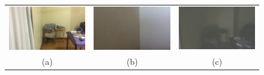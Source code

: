 \documentclass[letterpaper, 10 pt, conference]{ieeeconf}  %
\begin{document}
\begin{figure}[htbp]
\begin{tabular}{ccc}
 \includegraphics[width=\imgW,height=\imgH]{rio-q8} &
 \includegraphics[width=\imgW,height=\imgH]{rio-rf8} &
 \includegraphics[width=\imgW,height=\imgH]{rio-r8-2} \\
 
  (a) & (b) & (c) \\


 


\end{tabular}
\end{figure}
\end{document}
